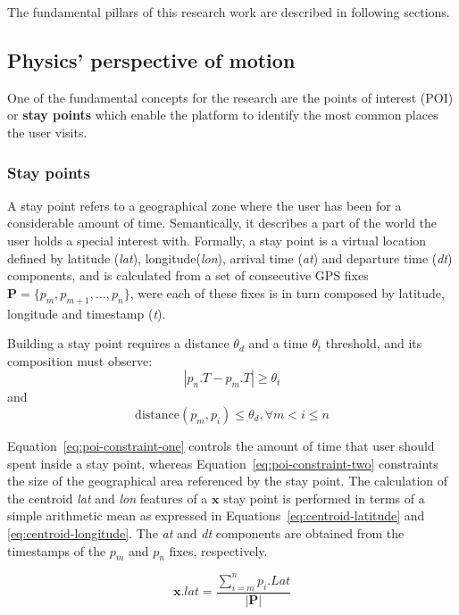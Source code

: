 \documentclass[ENG,PhD]{cinvestav}
\begin{document}
The fundamental pillars of this research work are described in following sections.

\subsection{Physics' perspective of motion}
One of the fundamental concepts for the research are the points of interest (POI) or \textbf{stay points} which enable the platform to identify the most common places the user visits.
\subsubsection*{Stay points}
A stay point refers to a geographical zone where the user has been for a considerable amount of time.
Semantically, it describes a part of the world the user holds a special interest with.
Formally, a stay point is a virtual location defined by latitude (\emph{lat}), longitude(\emph{lon}), arrival time (\emph{at}) and departure time (\emph{dt}) components, and is calculated from a set of consecutive GPS fixes $\mathbf{P}=\{p_{m},p_{m+1},\ldots,p_{n}\}$, were each of these fixes is in turn composed by latitude, longitude and timestamp (\emph{t}).

Building a stay point requires a distance $\theta_{d}$ and a time $\theta_{t}$ threshold, and its composition must observe:
\begin{equation}
  \left|p_{n}.T-p_{m}.T\right|\geq\theta_{t}
  \label{eq:poi-constraint-one}
\end{equation}
and
\begin{equation}
  \text{distance}(p_{m},p_{i})\leq\theta_{d}, \forall m<i\leq n
  \label{eq:poi-constraint-two}
\end{equation}

Equation~\ref{eq:poi-constraint-one} controls the amount of time that user should spent inside a stay point, whereas Equation~\ref{eq:poi-constraint-two} constraints the size of the geographical area referenced by the stay point.
The calculation of the centroid \emph{lat} and \emph{lon} features of a $\mathbf{x}$ stay point is performed in terms of a simple arithmetic mean as expressed in Equations~\ref{eq:centroid-latitude} and \ref{eq:centroid-longitude}.
The \emph{at} and \emph{dt} components are obtained from the timestamps of the $p_m$ and $p_n$ fixes, respectively.

\begin{equation}
\mathbf{x}.lat = \frac{ \sum_{i=m}^{n}p_{i}.Lat }{ |\mathbf{P}| }\label{eq:centroid-latitude}
\end{equation}
\end{document}
